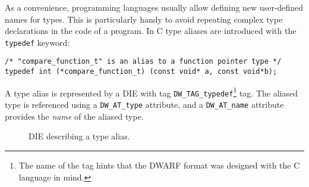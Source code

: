 As a convenience, programming languages usually allow defining new user-defined
names for types. This is particularly handy to avoid repeating complex type
declarations in the code of a program. In C type aliases are introduced with
the \texttt{typedef} keyword:

\begin{verbatim}
/* "compare_function_t" is an alias to a function pointer type */
typedef int (*compare_function_t) (const void* a, const void*b);
\end{verbatim}

A type alias is represented by a DIE with tag
\verb|DW_TAG_typedef|\footnote{The name of the tag hints that
the DWARF format was designed with the C language in mind.} tag. The aliased
type is referenced using a \verb|DW_AT_type| attribute, and
a \verb|DW_AT_name| attribute provides the \emph{name} of the aliased type.

\begin{figure}
  \centering
  \caption{DIE describing a type alias.}
  \label{fig:typedef-die}
\end{figure}



